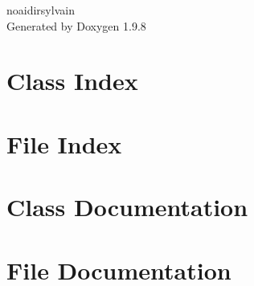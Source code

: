 \documentclass[twoside]{book}
\newcommand{\+}{\discretionary{\mbox{\scriptsize$\hookleftarrow$}}{}{}}
\newcommand{\clearemptydoublepage}{%
    \newpage{\pagestyle{empty}\cleardoublepage}%
  }
\begin{document}
  \raggedbottom
    \hypersetup{pageanchor=false,
                bookmarksnumbered=true,
                pdfencoding=unicode
               }
  \begin{titlepage}
  \vspace*{7cm}
  \begin{center}%
  {\Large noaidirsylvain}\\
  \vspace*{1cm}
  {\large Generated by Doxygen 1.9.8}\\
  \end{center}
  \end{titlepage}
  \clearemptydoublepage
  \tableofcontents
  \clearemptydoublepage
  \hypersetup{pageanchor=true}
\chapter{Class Index}

\chapter{File Index}

\chapter{Class Documentation}















\chapter{File Documentation}









  \backmatter
  \newpage
  \clearemptydoublepage
  \printindex
\end{document}
